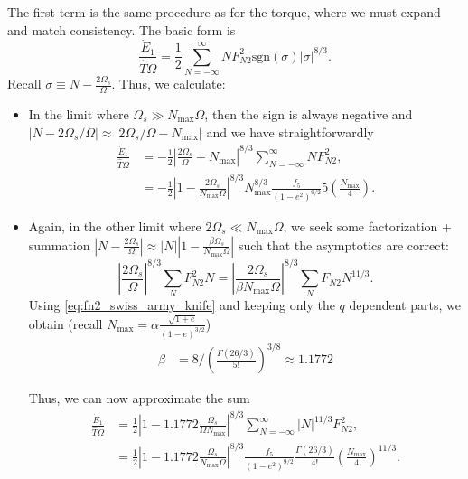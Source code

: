 \documentclass[11pt,
        usenames, %
        dvipsnames %
    ]{article}
\newcommand*{\abs}[1]{\left|#1\right|}
\newcommand*{\p}[1]{\left(#1\right)}
\begin{document}
The first term is the same procedure as for the torque, where we must expand and
match consistency. The basic form is
\begin{equation}
    \frac{\dot{E}_1}{\hat{T}\Omega} = \frac{1}{2}
        \sum\limits_{N = -\infty}^\infty NF_{N2}^2 \mathrm{sgn}(\sigma)
            \abs{\sigma}^{8/3}.
\end{equation}
Recall $\sigma \equiv N - \frac{2\Omega_s}{\Omega}$. Thus, we calculate:
\begin{itemize}
    \item In the limit where $\Omega_s \gg N_{\max}\Omega$, then the sign is
        always negative and $\abs{N - 2\Omega_s / \Omega} \approx
        \abs{2\Omega_s / \Omega - N_{\max}}$ and we have straightforwardly
        \begin{align}
            \frac{\dot{E}_1}{\hat{T}\Omega}
                &= -\frac{1}{2}
                    \abs{\frac{2\Omega_s}{\Omega} - N_{\max}}^{8/3}
                    \sum\limits_{N = -\infty}^\infty NF_{N2}^2,\\
                &= -\frac{1}{2}
                    \abs{1 - \frac{2\Omega_s}{N_{\max}\Omega}}^{8/3}
                    N_{\max}^{8/3}
                    \frac{f_5}{\p{1 - e^2}^{9/2}}5\p{\frac{N_{\max}}{4}}.
        \end{align}
    \item Again, in the other limit where $2\Omega_s \ll N_{\max}\Omega$, we
        seek some factorization + summation $\abs{N - \frac{2\Omega_s}{\Omega}}
        \approx \abs{N}\abs{1 - \frac{\beta \Omega_s}{N_{\max}\Omega}}$ such
        that the asymptotics are correct:
        \begin{equation}
            \abs{\frac{2\Omega_s}{\Omega}}^{8/3} \sum\limits_N F_{N2}^2 N
                = \abs{\frac{2\Omega_s}{\beta N_{\max}\Omega}}^{8/3}
                    \sum\limits_N F_{N2}N^{11/3}.
        \end{equation}
        Using \autoref{eq:fn2_swiss_army_knife} and keeping only the $q$
        dependent parts, we obtain (recall $N_{\max} = \alpha \frac{\sqrt{1 +
        e}}{\p{1 - e}^{3/2}}$)
        \begin{align}
            \beta &= 8 / \p{\frac{\Gamma(26/3)}{5!}}^{3/8} \approx 1.1772
        \end{align}

        Thus, we can now approximate the sum
        \begin{align}
            \frac{\dot{E}_1}{\hat{T}\Omega}
                &= \frac{1}{2}
                    \abs{1 - 1.1772\frac{\Omega_s}{\Omega N_{\max}}}^{8/3}
                    \sum\limits_{N = -\infty}^\infty \abs{N}^{11/3}F_{N2}^2,\\
                &= \frac{1}{2}
                    \abs{1 - 1.1772\frac{\Omega_s}{N_{\max}\Omega}}^{8/3}
                    \frac{f_5}{\p{1 - e^2}^{9/2}}
                    \frac{\Gamma(26/3)}{4!}\p{\frac{N_{\max}}{4}}^{11/3}.
        \end{align}
\end{itemize}
\end{document}
